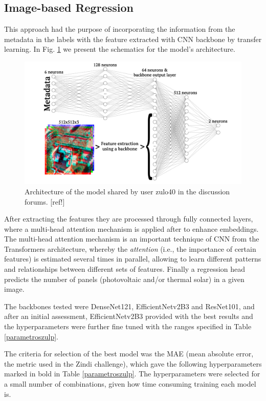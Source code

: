 \documentclass[conference]{IEEEtran}
\begin{document}
\subsection{Image-based Regression}

This approach had the purpose of incorporating the information from the metadata in the labels with the feature extracted with CNN backbone by transfer learning. In Fig. \ref{fig:nn} we present the schematics for the model's architecture.

\begin{figure}[H]
    \centering
    \includegraphics[width=1\linewidth]{assets/nn.png}
    \caption{Architecture of the model shared by user zulo40 in the discussion forums. [ref!]}
    \label{fig:nn}
\end{figure}

After extracting the features they are processed through fully connected layers, where a multi-head attention mechanism is applied after to enhance embeddings. The multi-head attention mechanism is an important technique of CNN from the Transformers architecture, whereby the \textit{attention} (i.e., the importance of certain features) is estimated several times in parallel, allowing to learn different patterns and relationships between different sets of features. Finally a regression head predicts the number of panels (photovoltaic and/or thermal solar) in a given image.

The backbones tested were DenseNet121, EfficientNetv2B3 and ResNet101, and after an initial assessment, EfficientNetv2B3 provided with the best results and the hyperparameters were further fine tuned with the ranges specified in Table \ref{parametroszulp}.

The criteria for selection of the best model was the MAE (mean absolute error, the metric used in the Zindi challenge), which gave the following hyperparameters marked in bold in Table \ref{parametroszulp}. The hyperparameters were selected for a small number of combinations, given how time consuming training each model is.
\end{document}
